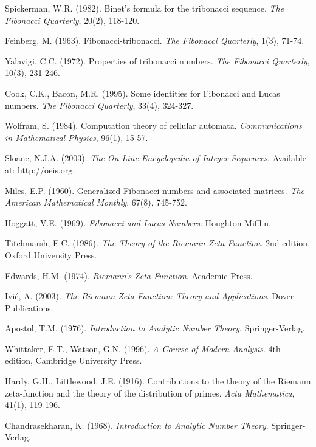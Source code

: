 \documentclass[12pt]{article}
\theoremstyle{plain}
\theoremstyle{definition}
\begin{document}
\begin{thebibliography}{99}
 Spickerman, W.R. (1982). Binet's formula for the tribonacci sequence. \emph{The Fibonacci Quarterly}, 20(2), 118-120.

 Feinberg, M. (1963). Fibonacci-tribonacci. \emph{The Fibonacci Quarterly}, 1(3), 71-74.

 Yalavigi, C.C. (1972). Properties of tribonacci numbers. \emph{The Fibonacci Quarterly}, 10(3), 231-246.

 Cook, C.K., Bacon, M.R. (1995). Some identities for Fibonacci and Lucas numbers. \emph{The Fibonacci Quarterly}, 33(4), 324-327.

 Wolfram, S. (1984). Computation theory of cellular automata. \emph{Communications in Mathematical Physics}, 96(1), 15-57.

 Sloane, N.J.A. (2003). \emph{The On-Line Encyclopedia of Integer Sequences}. Available at: http://oeis.org.

 Miles, E.P. (1960). Generalized Fibonacci numbers and associated matrices. \emph{The American Mathematical Monthly}, 67(8), 745-752.

 Hoggatt, V.E. (1969). \emph{Fibonacci and Lucas Numbers}. Houghton Mifflin.

 Titchmarsh, E.C. (1986). \emph{The Theory of the Riemann Zeta-Function}. 2nd edition, Oxford University Press.

 Edwards, H.M. (1974). \emph{Riemann's Zeta Function}. Academic Press.

 Ivić, A. (2003). \emph{The Riemann Zeta-Function: Theory and Applications}. Dover Publications.

 Apostol, T.M. (1976). \emph{Introduction to Analytic Number Theory}. Springer-Verlag.

 Whittaker, E.T., Watson, G.N. (1996). \emph{A Course of Modern Analysis}. 4th edition, Cambridge University Press.

 Hardy, G.H., Littlewood, J.E. (1916). Contributions to the theory of the Riemann zeta-function and the theory of the distribution of primes. \emph{Acta Mathematica}, 41(1), 119-196.

 Chandrasekharan, K. (1968). \emph{Introduction to Analytic Number Theory}. Springer-Verlag.


\end{thebibliography}
\end{document}

